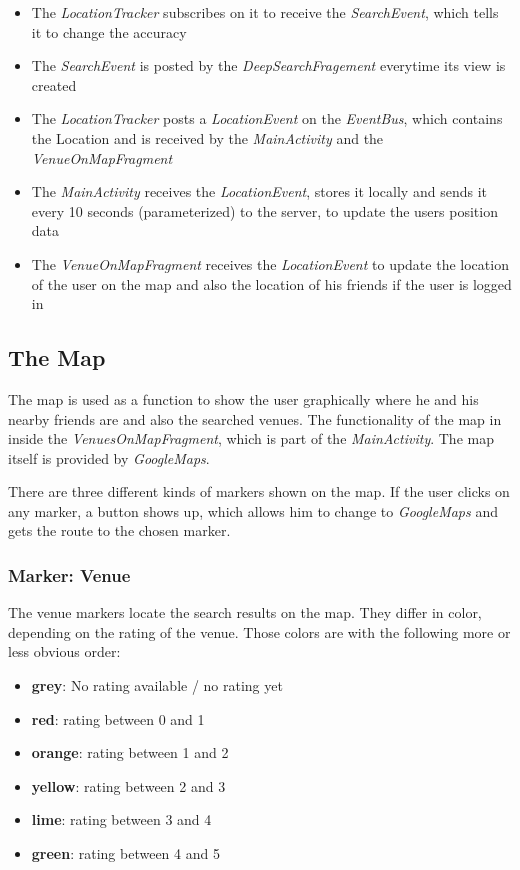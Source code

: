 \begin{itemize}
\item The \textit{LocationTracker} subscribes on it to receive the \textit{SearchEvent}, which tells it to change the accuracy
\item The \textit{SearchEvent} is posted by the \textit{DeepSearchFragement} everytime its view is created
\item The \textit{LocationTracker} posts a \textit{LocationEvent} on the \textit{EventBus}, which contains the Location and is received by the \textit{MainActivity} and the \textit{VenueOnMapFragment}
\item The \textit{MainActivity} receives the \textit{LocationEvent}, stores it locally and sends it every 10 seconds (parameterized) to the server, to update the users position data
\item The \textit{VenueOnMapFragment} receives the \textit{LocationEvent} to update the location of the user on the map and also the location of his friends if the user is logged in
\end{itemize}

\subsection{The Map} \label{markervenue}
The map is used as a function to show the user graphically where he and his nearby friends are and also the searched venues. The functionality of the map in inside the \textit{VenuesOnMapFragment}, which is part of the \textit{MainActivity}. The map itself is provided by \textit{GoogleMaps}.

There are three different kinds of markers shown on the map. If the user clicks on any marker, a button shows up, which allows him to change to \textit{GoogleMaps} and gets the route to the chosen marker. 

\subsubsection{Marker: Venue} 
The venue markers locate the search results on the map. They differ in color, depending on the rating of the venue. Those colors are with the following more or less obvious order:

\begin{itemize}
\item \textbf{grey}: No rating available / no rating yet
\item \textbf{red}: rating between 0 and 1
\item \textbf{orange}: rating between 1 and 2
\item \textbf{yellow}: rating between 2 and 3
\item \textbf{lime}: rating between 3 and 4
\item \textbf{green}: rating between 4 and 5
\end{itemize}

